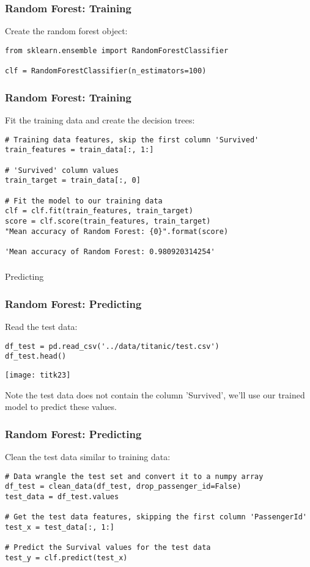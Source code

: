 \begin{frame}[fragile]\frametitle{Random Forest: Training}
Create the random forest object:
\begin{lstlisting}
from sklearn.ensemble import RandomForestClassifier

clf = RandomForestClassifier(n_estimators=100)
\end{lstlisting}
\end{frame}

\begin{frame}[fragile]\frametitle{Random Forest: Training}
Fit the training data and create the decision trees:
\begin{lstlisting}
# Training data features, skip the first column 'Survived'
train_features = train_data[:, 1:]

# 'Survived' column values
train_target = train_data[:, 0]

# Fit the model to our training data
clf = clf.fit(train_features, train_target)
score = clf.score(train_features, train_target)
"Mean accuracy of Random Forest: {0}".format(score)

'Mean accuracy of Random Forest: 0.980920314254'
\end{lstlisting}
\end{frame}

\begin{frame}[fragile]\frametitle{}
\begin{center}
{\Large Predicting}
\end{center}
\end{frame}


\begin{frame}[fragile]\frametitle{Random Forest: Predicting}
Read the test data:
\begin{lstlisting}
df_test = pd.read_csv('../data/titanic/test.csv')
df_test.head()
\end{lstlisting}
\begin{center}
\texttt{[image: titk23]}
\end{center}
Note the test data does not contain the column 'Survived', we'll use our trained model to predict these values.
\end{frame}


\begin{frame}[fragile]\frametitle{Random Forest: Predicting}
Clean the test data similar to training data:
\begin{lstlisting}
# Data wrangle the test set and convert it to a numpy array
df_test = clean_data(df_test, drop_passenger_id=False)
test_data = df_test.values

# Get the test data features, skipping the first column 'PassengerId'
test_x = test_data[:, 1:]

# Predict the Survival values for the test data
test_y = clf.predict(test_x)
\end{lstlisting}
\end{frame}

